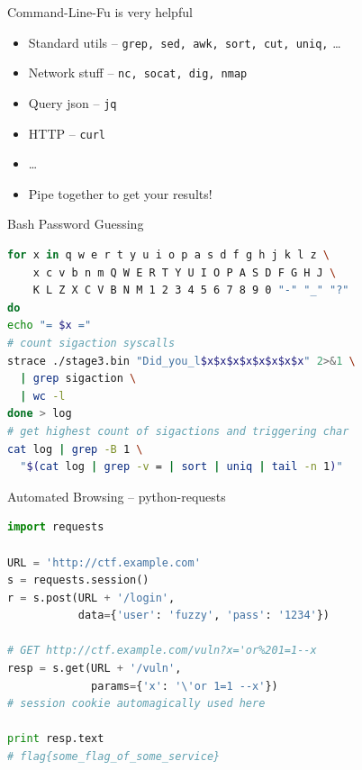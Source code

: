\begin{frame}
  {Command-Line-Fu is very helpful}

  \begin{itemize}
    \item Standard utils -- \texttt{grep, sed, awk, sort, cut, uniq,} \ldots
    \item Network stuff -- \texttt{nc, socat, dig, nmap}
    \item Query json -- \texttt{jq}
    \item HTTP -- \texttt{curl}
    \item \ldots
  \end{itemize}

  \begin{itemize}
    \item Pipe together to get your results!
  \end{itemize}
\end{frame}




\begin{frame}[fragile]
  {Bash Password Guessing}

  \begin{lstlisting}[language=bash]
for x in q w e r t y u i o p a s d f g h j k l z \
    x c v b n m Q W E R T Y U I O P A S D F G H J \
    K L Z X C V B N M 1 2 3 4 5 6 7 8 9 0 "-" "_" "?"
do
echo "= $x ="
# count sigaction syscalls
strace ./stage3.bin "Did_you_l$x$x$x$x$x$x$x$x" 2>&1 \
  | grep sigaction \
  | wc -l
done > log
# get highest count of sigactions and triggering char
cat log | grep -B 1 \
  "$(cat log | grep -v = | sort | uniq | tail -n 1)"
  \end{lstlisting}

\end{frame}



\begin{frame}[fragile]
  {Automated Browsing -- python-requests}

  \begin{lstlisting}[language=python]
import requests

URL = 'http://ctf.example.com'
s = requests.session()
r = s.post(URL + '/login',
           data={'user': 'fuzzy', 'pass': '1234'})

# GET http://ctf.example.com/vuln?x='or%201=1--x
resp = s.get(URL + '/vuln',
             params={'x': '\'or 1=1 --x'})
# session cookie automagically used here

print resp.text
# flag{some_flag_of_some_service}
  \end{lstlisting}
\end{frame}

